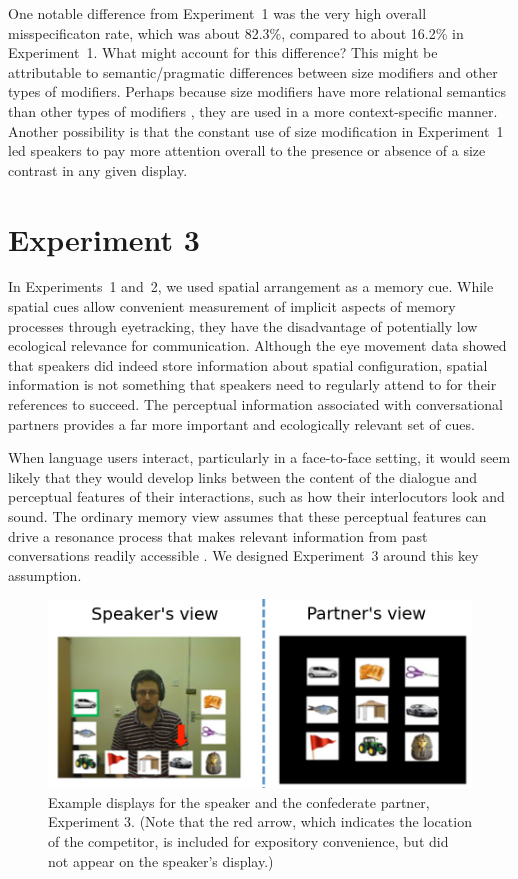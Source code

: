 \documentclass[natbib,doc,a4paper]{apa6}
\begin{document}
One notable difference from Experiment~1 was the very high overall misspecificaton rate, which was about 
82.3\%, compared to about 
16.2\% 
in Experiment~1.  What might account for this difference?  This might be attributable to semantic/pragmatic differences between size modifiers and other types of modifiers. Perhaps because size modifiers have more relational semantics than other types of modifiers \citep{GrodnerSedivy2011}, they are used in a more context-specific manner. Another possibility is that the constant use of size modification in Experiment~1 led speakers to pay more attention overall to the presence or absence of a size contrast in any given display.

\section*{Experiment 3}
\label{sec:org84b738e}

In Experiments~1 and~2, we used spatial arrangement as a memory cue. While spatial cues allow convenient measurement of implicit aspects of memory processes through eyetracking, they have the disadvantage of potentially low ecological relevance for communication. Although the eye movement data showed that speakers did indeed store information about spatial configuration, spatial information is not something that speakers need to regularly attend to for their references to succeed. The perceptual information associated with conversational partners provides a far more important and ecologically relevant set of cues.

When language users interact, particularly in a face-to-face setting, it would seem likely that they would develop links between the content of the dialogue and perceptual features of their interactions, such as how their interlocutors look and sound. The ordinary memory view assumes that these perceptual features can drive a resonance process that makes relevant information from past conversations readily accessible \citep{hortongerrig05}. We designed Experiment~3 around this key assumption. 

\begin{figure}[htbp]
\centering
\includegraphics[width=.9\linewidth]{figs/Exp3_C-S.png}
\caption{\label{fig:orgcd66b9a}
Example displays for the speaker and the confederate partner, Experiment 3. (Note that the red arrow, which indicates the location of the competitor, is included for expository convenience, but did not appear on the speaker's display.)}
\end{figure}
\end{document}
